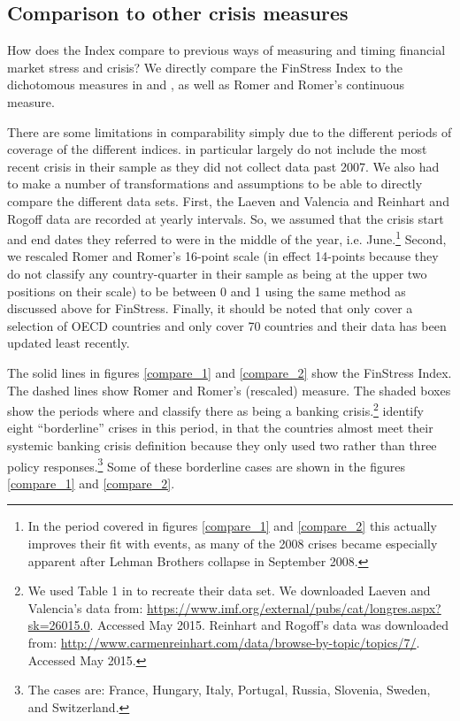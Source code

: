 \documentclass[]{article}
\begin{document}


\subsection{Comparison to other crisis
measures}\label{comparison-to-other-crisis-measures}

How does the Index compare to previous ways of measuring and timing financial market stress and crisis? We directly compare the FinStress Index to the dichotomous measures in \cite{Reinhart2009} and \cite{laeven2013}, as well as Romer and Romer's \citeyearpar{Romer2015} continuous measure.

There are some limitations in comparability simply due to the
different periods of coverage of the different indices. \cite{Romer2015}
in particular largely do not include the most recent crisis in their sample as they did not collect data past 2007. We also had to make a number of transformations and assumptions to be able to directly compare the different data sets. First, the Laeven and Valencia and Reinhart and Rogoff data are recorded at yearly intervals. So, we assumed that the crisis start and end dates they referred to were in the middle of the year, i.e. June.\footnote{In the period covered in figures \ref{compare_1} and \ref{compare_2} this actually improves their fit with events, as many of the 2008 crises became especially apparent after Lehman Brothers collapse in September 2008.} Second, we rescaled Romer and Romer's 16-point scale (in effect 14-points because they do not classify any country-quarter in
their sample as being at the upper two positions on their scale) to be between 0 and 1 using the same method as discussed above for FinStress. Finally, it should be noted that \cite{Romer2015} only cover a selection of OECD countries and \cite{Reinhart2009} only cover 70 countries and their data has been updated least recently.

The solid lines in figures \ref{compare_1} and \ref{compare_2} show the FinStress Index. The dashed lines show Romer and Romer's (rescaled) measure. The shaded boxes show the periods where \cite{laeven2013} and \cite{Reinhart2009} classify there as being a banking crisis.\footnote{We used Table 1 in \cite{Romer2015} to recreate their data set. We downloaded Laeven and Valencia's data from: \url{https://www.imf.org/external/pubs/cat/longres.aspx?sk=26015.0}.
  Accessed May 2015. Reinhart and Rogoff's data was downloaded from:
  \url{http://www.carmenreinhart.com/data/browse-by-topic/topics/7/}.
  Accessed May 2015.} \cite{laeven2013} identify eight ``borderline'' crises in this period, in that the countries almost meet their systemic banking crisis definition because they only used two rather than three policy responses.\footnote{The cases are: France, Hungary, Italy, Portugal, Russia, Slovenia, Sweden, and Switzerland.} Some of these borderline cases are shown in the figures \ref{compare_1} and \ref{compare_2}.
\end{document}
